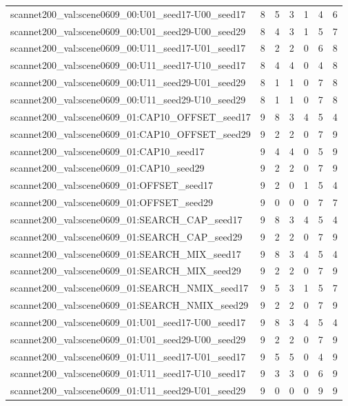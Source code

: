 \begin{table}[t]
\begin{tabular}{lrrrrrr}
scannet200\_val:scene0609\_00:U01\_seed17-U00\_seed17 & 8 & 5 & 3 & 1 & 4 & 6 \\
scannet200\_val:scene0609\_00:U01\_seed29-U00\_seed29 & 8 & 4 & 3 & 1 & 5 & 7 \\
scannet200\_val:scene0609\_00:U11\_seed17-U01\_seed17 & 8 & 2 & 2 & 0 & 6 & 8 \\
scannet200\_val:scene0609\_00:U11\_seed17-U10\_seed17 & 8 & 4 & 4 & 0 & 4 & 8 \\
scannet200\_val:scene0609\_00:U11\_seed29-U01\_seed29 & 8 & 1 & 1 & 0 & 7 & 8 \\
scannet200\_val:scene0609\_00:U11\_seed29-U10\_seed29 & 8 & 1 & 1 & 0 & 7 & 8 \\
scannet200\_val:scene0609\_01:CAP10\_OFFSET\_seed17 & 9 & 8 & 3 & 4 & 5 & 4 \\
scannet200\_val:scene0609\_01:CAP10\_OFFSET\_seed29 & 9 & 2 & 2 & 0 & 7 & 9 \\
scannet200\_val:scene0609\_01:CAP10\_seed17 & 9 & 4 & 4 & 0 & 5 & 9 \\
scannet200\_val:scene0609\_01:CAP10\_seed29 & 9 & 2 & 2 & 0 & 7 & 9 \\
scannet200\_val:scene0609\_01:OFFSET\_seed17 & 9 & 2 & 0 & 1 & 5 & 4 \\
scannet200\_val:scene0609\_01:OFFSET\_seed29 & 9 & 0 & 0 & 0 & 7 & 7 \\
scannet200\_val:scene0609\_01:SEARCH\_CAP\_seed17 & 9 & 8 & 3 & 4 & 5 & 4 \\
scannet200\_val:scene0609\_01:SEARCH\_CAP\_seed29 & 9 & 2 & 2 & 0 & 7 & 9 \\
scannet200\_val:scene0609\_01:SEARCH\_MIX\_seed17 & 9 & 8 & 3 & 4 & 5 & 4 \\
scannet200\_val:scene0609\_01:SEARCH\_MIX\_seed29 & 9 & 2 & 2 & 0 & 7 & 9 \\
scannet200\_val:scene0609\_01:SEARCH\_NMIX\_seed17 & 9 & 5 & 3 & 1 & 5 & 7 \\
scannet200\_val:scene0609\_01:SEARCH\_NMIX\_seed29 & 9 & 2 & 2 & 0 & 7 & 9 \\
scannet200\_val:scene0609\_01:U01\_seed17-U00\_seed17 & 9 & 8 & 3 & 4 & 5 & 4 \\
scannet200\_val:scene0609\_01:U01\_seed29-U00\_seed29 & 9 & 2 & 2 & 0 & 7 & 9 \\
scannet200\_val:scene0609\_01:U11\_seed17-U01\_seed17 & 9 & 5 & 5 & 0 & 4 & 9 \\
scannet200\_val:scene0609\_01:U11\_seed17-U10\_seed17 & 9 & 3 & 3 & 0 & 6 & 9 \\
scannet200\_val:scene0609\_01:U11\_seed29-U01\_seed29 & 9 & 0 & 0 & 0 & 9 & 9 \\

\end{tabular}
\end{table}

